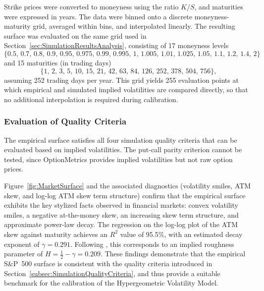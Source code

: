 Strike prices were converted to moneyness using the ratio $K/S$, and maturities were expressed in years. The data were binned onto a discrete moneyness-maturity grid, averaged within bins, and interpolated linearly. The resulting surface was evaluated on the same grid used in Section~\ref{sec:SimulationResultsAnalysis}, consisting of 17 moneyness levels
\begin{equation*}
    \{0.5,\, 0.7,\, 0.8,\, 0.9,\, 0.95,\, 0.975,\, 0.99,\, 0.995,\, 1,\, 1.005,\, 1.01,\, 1.025,\, 1.05,\, 1.1,\, 1.2,\, 1.4,\, 2\}
\end{equation*}
and 15 maturities (in trading days)
\begin{equation*}
    \{1,\, 2,\, 3,\, 5,\, 10,\, 15,\, 21,\, 42,\, 63,\, 84,\, 126,\, 252,\, 378,\, 504,\, 756\},
\end{equation*}
assuming 252 trading days per year. This grid yields 255 evaluation points at which empirical and simulated implied volatilities are compared directly, so that no additional interpolation is required during calibration.

\subsubsection*{Evaluation of Quality Criteria}
The empirical surface satisfies all four simulation quality criteria that can be evaluated based on implied volatilities. The put-call parity criterion cannot be tested, since OptionMetrics provides implied volatilities but not raw option prices.

Figure~\ref{fig:MarketSurface} and the associated diagnostics (volatility smiles, ATM skew, and log-log ATM skew term structure) confirm that the empirical surface exhibits the key stylized facts observed in financial markets: convex volatility smiles, a negative at-the-money skew, an increasing skew term structure, and approximate power-law decay. The regression on the log-log plot of the ATM skew against maturity achieves an $R^2$ value of 95.5\%, with an estimated decay exponent of $\gamma = 0.291$. Following \citet{Fukasawa2011}, this corresponds to an implied roughness parameter of $H = \tfrac{1}{2} - \gamma = 0.209$. These findings demonstrate that the empirical S\&P~500 surface is consistent with the quality criteria introduced in Section~\ref{subsec:SimulationQualityCriteria}, and thus provide a suitable benchmark for the calibration of the Hypergeometric Volatility Model.

